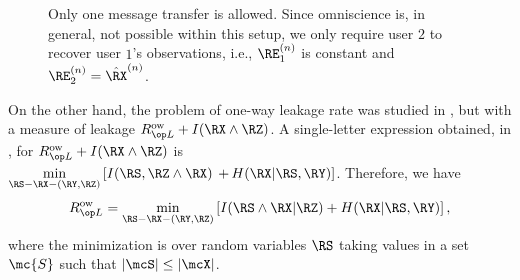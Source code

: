\begin{figure}[h]
\centering
\resizebox{0.9\width}{!}{}
\caption{Only one message transfer is allowed.  Since omniscience is, in general, not possible within this setup, we only require user $2$ to recover user $1$'s observations, i.e., $\RE_1^{(n)}$ is  constant and $\RE_2^{(n)}= \hat{\RX}^{(n)}$.}
\label{fig:oneway}
 \end{figure}
On the other hand, the problem of one-way leakage rate was studied in \cite{vinod07}, but with a measure of leakage $\rl^{\text{ow}}+I(\RX \wedge \RZ)$. A single-letter expression obtained, in \cite[Theorem~1]{vinod07}, for $\rl^{\text{ow}}+I(\RX \wedge \RZ)$ is $\min\limits_{\RS-\RX-(\RY, \RZ)}\left[I(\RS,\RZ \wedge \RX)\right.\linebreak\left.+\,H(\RX | \RS, \RY)\right]$.
Therefore, we have
\begin{align}\label{eq:oneway_rl}
    \rl^{\text{ow}} = \min\limits_{\RS-\RX-(\RY, \RZ)}\left[I(\RS \wedge \RX | \RZ)+H(\RX | \RS, \RY)\right],
\end{align}
where the minimization is over random variables $\RS$ taking values in a set $\mc{S}$ such that $|\mcS|\leq |\mcX|$.


